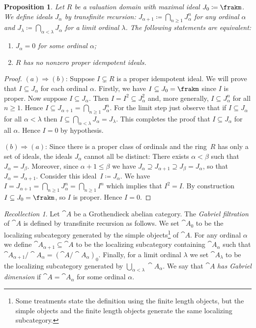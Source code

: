 \documentclass{amsart}
\numberwithin{equation}{section}%
\newtheorem{Prop}[equation]{Proposition}
\theoremstyle{remark}
\newtheorem{Rec}[equation]{Recollection}
\newcounter{enum-resume-hack}
\begin{document}
\begin{Prop}\label{prop:jacobson-nilpotent}
	Let $R$ be a valuation domain with maximal ideal $J_0\coloneqq\frakm$. We define ideals $J_\alpha$ by transfinite recursion: $J_{\alpha + 1} \coloneqq \bigcap_{n \ge 1} J_\alpha^n$ for any ordinal $\alpha$ and $J_\lambda \coloneqq \bigcap_{\alpha < \lambda} J_\alpha$ for a limit ordinal $\lambda$. The following statements are equivalent:
	\begin{enumerate}
		\item $J_\alpha = 0$ for some ordinal $\alpha$;
		\item $R$ has no nonzero proper idempotent ideals.
	\end{enumerate}
\end{Prop}

\begin{proof}
	$(a)\Rightarrow (b)$: Suppose $I\subsetneq R$ is a proper idempotent ideal. We will prove that $I\subseteq J_\alpha$ for each ordinal $\alpha$. Firstly, we have $I \subseteq J_0 = \frakm$ since $I$ is proper. Now suppose $I \subseteq J_\alpha$. Then $I=I^2 \subseteq J_\alpha^2$ and, more generally, $I \subseteq J_\alpha^n$ for all $n \ge 1$. Hence $I \subseteq J_{\alpha+1} = \bigcap_{n \ge 1} J_\alpha^n$. For the limit step just observe that if $I \subseteq J_\alpha$ for all $\alpha < \lambda$ then $I \subseteq \bigcap_{\alpha < \lambda} J_\alpha = J_\lambda$. This completes the proof that $I \subseteq J_\alpha$ for all $\alpha$. Hence $I = 0$ by hypothesis.

	$(b)\Rightarrow (a)$: Since there is a proper class of ordinals and the ring~$R$ has only a set of ideals, the ideals $J_\alpha$ cannot all be distinct: There exists $\alpha < \beta$ such that $J_\alpha = J_\beta$. Moreover, since $\alpha + 1\le \beta$ we have $J_\alpha \supseteq J_{\alpha+1} \supseteq J_\beta = J_\alpha$, so that $J_\alpha = J_{\alpha+1}$. Consider this ideal~$I\coloneqq J_\alpha$. We have $I=J_{\alpha+1} = \bigcap_{n \ge 1} J_\alpha^n = \bigcap_{n \ge 1} I^n$ which implies that $I^2=I$. By construction $I \subseteq J_0 = \frakm$, so $I$ is proper. Hence $I=0$.
\end{proof}

\begin{Rec}
	Let $\cat A$ be a Grothendieck abelian category. The \emph{Gabriel filtration} of $\cat A$ is defined by transfinite recursion as follows. We set $\cat A_0$ to be the localizing subcategory generated by the simple objects\footnote{Some treatments state the definition using the finite length objects, but the simple objects and the finite length objects generate the same localizing subcategory.} of $\cat A$. For any ordinal $\alpha$ we define $\cat A_{\alpha + 1} \subseteq \cat A$ to be the localizing subcategory containing $\cat A_\alpha$ such that $\cat A_{\alpha + 1}/\cat A_\alpha = (\cat A/\cat A_{\alpha})_0$. Finally, for a limit ordinal $\lambda$ we set $\cat A_\lambda$ to be the localizing subcategory generated by $\bigcup_{\alpha < \lambda} \cat A_\alpha$. We say that $\cat A$ \emph{has Gabriel dimension} if $\cat A=\cat A_\alpha$ for some ordinal $\alpha$.
\end{Rec}
\end{document}
